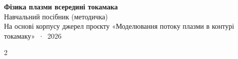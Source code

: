 

\thispagestyle{plain}
\begin{center}
{\LARGE\bfseries\sffamily Фізика плазми всередині токамака}\\[3pt]
{\large\sffamily Навчальний посібник (методичка)}\\[2pt]
{\small На основі корпусу джерел проєкту «Моделювання потоку плазми в контурі токамаку» \,·\, 2026}
\end{center}
\vspace{-1.5em}
{\footnotesize\renewcommand{\cftchapfont}{\bfseries\footnotesize}\renewcommand{\cftchappagefont}{\bfseries\footnotesize}
\renewcommand{\cftsecfont}{\footnotesize}\renewcommand{\cftsecpagefont}{\footnotesize}
\begin{multicols}{2}
\tableofcontents
\end{multicols}}















\appendix


